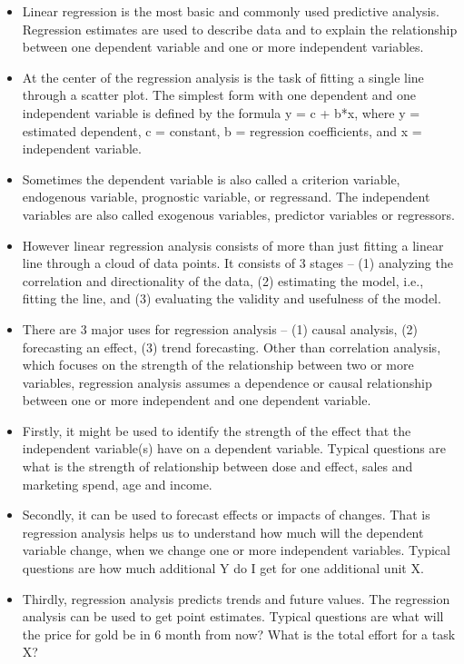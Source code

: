 \documentclass[]{report}
\begin{document}
\begin{itemize}
	\item 
	Linear regression is the most basic and commonly used predictive analysis.  Regression estimates are used to describe data and to explain the relationship between one dependent variable and one or more independent variables.
	
	\item  At the center of the regression analysis is the task of fitting a single line through a scatter plot.  The simplest form with one dependent and one independent variable is defined by the formula y = c + b*x, where y = estimated dependent, c = constant, b = regression coefficients, and x = independent variable.
	
	\item Sometimes the dependent variable is also called a criterion variable, endogenous variable, prognostic variable, or regressand.  The independent variables are also called exogenous variables, predictor variables or regressors.
	
	\item  However linear regression analysis consists of more than just fitting a linear line through a cloud of data points.  It consists of 3 stages – (1) analyzing the correlation and directionality of the data, (2) estimating the model, i.e., fitting the line, and (3) evaluating the validity and usefulness of the model.
	
	\item 	There are 3 major uses for regression analysis – (1) causal analysis, (2) forecasting an effect, (3) trend forecasting.  Other than correlation analysis, which focuses on the strength of the relationship between two or more variables, regression analysis assumes a dependence or causal relationship between one or more independent and one dependent variable.
	
	\item 	Firstly, it might be used to identify the strength of the effect that the independent variable(s) have on a dependent variable.  Typical questions are what is the strength of relationship between dose and effect, sales and marketing spend, age and income.
	
	\item 	Secondly, it can be used to forecast effects or impacts of changes.  That is regression analysis helps us to understand how much will the dependent variable change, when we change one or more independent variables.  Typical questions are how much additional Y do I get for one additional unit X.
	
	\item Thirdly, regression analysis predicts trends and future values.  The regression analysis can be used to get point estimates.  Typical questions are what will the price for gold be in 6 month from now?  What is the total effort for a task X?
\end{itemize}
\end{document}
